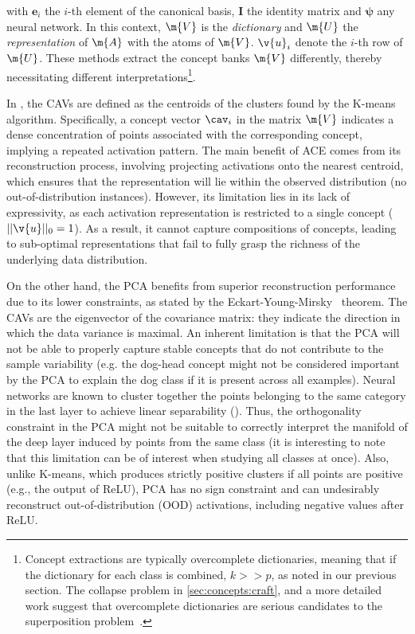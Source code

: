 with $\bm{e}_i$ the $i$-th element of the canonical basis, $\mathbf{I}$ the identity matrix and $\bm{\psi}$ any neural network. 
In this context, $\m{V}$ is the \emph{dictionary} and $\m{U}$ the \emph{representation} of $\m{A}$ with the atoms of $\m{V}$. $\v{u}_i$ denote the $i$-th row of $\m{U}$. 
These methods extract the concept banks $\m{V}$ differently, thereby necessitating different interpretations\footnote{Concept extractions are typically overcomplete dictionaries, meaning that if the dictionary for each class is combined, $k >> p$, as noted in our previous section. The collapse problem in \autoref{sec:concepts:craft}, and a more detailed work \cite{bricken2023monosemanticity} suggest that overcomplete dictionaries are serious candidates to the superposition problem~\cite{elhage2022superposition}.}. 

In \ACE, the CAVs are defined as the centroids of the clusters found by the K-means algorithm.
Specifically, a concept vector $\cav_i$ in the matrix $\m{V}$ indicates a dense concentration of points associated with the corresponding concept, implying a repeated activation pattern. 
The main benefit of ACE comes from its reconstruction process, involving projecting activations onto the nearest centroid, which ensures that the representation will lie within the observed distribution (no out-of-distribution instances). %
However, its limitation lies in its lack of expressivity, as each activation representation is restricted to a single concept ($||\v{u}||_{0}=1$). As a result, it cannot capture compositions of concepts, leading to sub-optimal representations that fail to fully grasp the richness of the underlying data distribution.

On the other hand, the PCA benefits from superior reconstruction performance due to its lower constraints, as stated by the Eckart-Young-Mirsky~\cite{eckart1936approximation} theorem. %
The CAVs are the eigenvector of the covariance matrix: they indicate the direction in which the data variance is maximal. %
An inherent limitation is that the PCA will not be able to properly capture stable concepts that do not contribute to the sample variability (e.g. the dog-head concept might not be considered important by the PCA to explain the dog class if it is present across all examples).
Neural networks are known to cluster together the points belonging to the same category in the last layer to achieve linear separability (\cite{paypan2020collapse, fel2023craft}). Thus, the orthogonality constraint in the PCA might not be suitable to correctly interpret the manifold of the deep layer induced by points from the same class (it is interesting to note that this limitation can be of interest when studying all classes at once).
Also, unlike K-means, which produces strictly positive clusters if all points are positive (e.g., the output of ReLU), PCA has no sign constraint and can undesirably reconstruct out-of-distribution (OOD) activations, including negative values after ReLU. %

